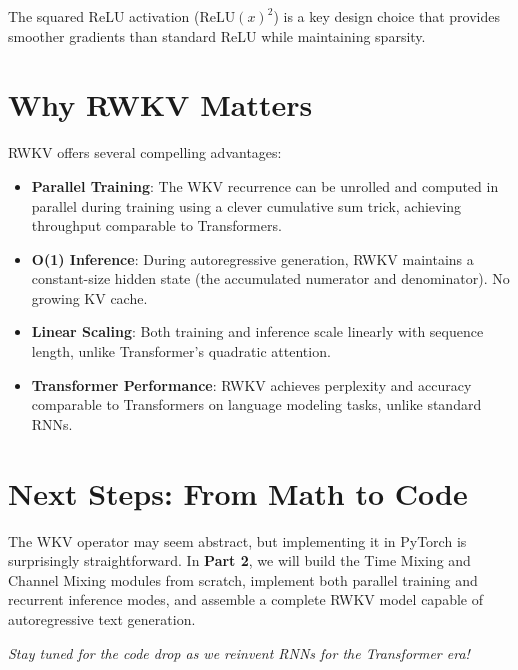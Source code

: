 \documentclass[12pt]{article}
\begin{document}
The squared ReLU activation ($\text{ReLU}(x)^2$) is a key design choice that provides smoother gradients than standard ReLU while maintaining sparsity.

\section*{Why RWKV Matters}

RWKV offers several compelling advantages:

\begin{itemize}
    \item \textbf{Parallel Training}: The WKV recurrence can be unrolled and computed in parallel during training using a clever cumulative sum trick, achieving throughput comparable to Transformers.
    
    \item \textbf{O(1) Inference}: During autoregressive generation, RWKV maintains a constant-size hidden state (the accumulated numerator and denominator). No growing KV cache.
    
    \item \textbf{Linear Scaling}: Both training and inference scale linearly with sequence length, unlike Transformer's quadratic attention.
    
    \item \textbf{Transformer Performance}: RWKV achieves perplexity and accuracy comparable to Transformers on language modeling tasks, unlike standard RNNs.
\end{itemize}

\section*{Next Steps: From Math to Code}

The WKV operator may seem abstract, but implementing it in PyTorch is surprisingly straightforward. In \textbf{Part 2}, we will build the Time Mixing and Channel Mixing modules from scratch, implement both parallel training and recurrent inference modes, and assemble a complete RWKV model capable of autoregressive text generation.

\vspace{1em}
\noindent \textit{Stay tuned for the code drop as we reinvent RNNs for the Transformer era!}
\end{document}
